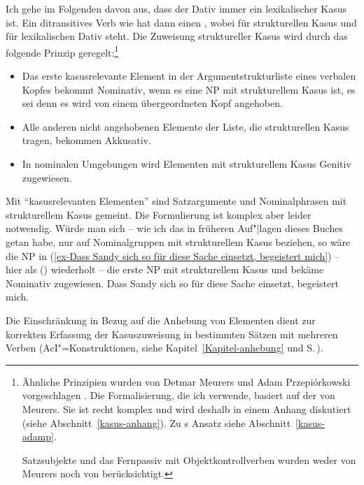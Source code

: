 Ich gehe im Folgenden davon aus, dass der Dativ immer ein lexikalischer Kasus ist. 
Ein ditransitives Verb wie  hat dann einen \compsw {},
wobei  für strukturellen Kasus und  für lexikalischen Dativ steht.
Die Zuweisung struktureller Kasus wird durch das folgende Prinzip geregelt:\footnote{
  Ähnliche Prinzipien wurden von Detmar Meurers und Adam Przepiórkowski
  vorgeschlagen \parencites[238]{Prze99}[80,93--94]{Prze99b}[206--207]{Meurers99b}[51--53]{MdK2001a}[Abschnitt~10.4.1.4]{Meurers2000b}.
  Die Formalisierung, die ich verwende, basiert auf der von Meurers. Sie ist recht komplex und wird
  deshalb in einem Anhang diskutiert (siehe Abschnitt~\ref{kasus-anhang}). Zu \prz{}s Ansatz siehe Abschnitt~\ref{kasus-adamp}.

  Satzsubjekte und das Fernpassiv mit Objektkontrollverben wurden weder von Meurers noch von \prz berücksichtigt.
%
}
\begin{prinzip-break}[Kasusprinzip]
\label{case-p}
\begin{itemize}
\item Das erste kasusrelevante Element in der Argumentstrukturliste eines verbalen Kopfes bekommt
  Nominativ, wenn es eine NP mit strukturellem Kasus ist, es sei denn es wird von einem übergeordneten Kopf angehoben. 
\item Alle anderen nicht angehobenen Elemente der Liste, die strukturellen Kasus tragen, bekommen Akkusativ.
\item In nominalen Umgebungen wird Elementen mit strukturellem Kasus Genitiv zugewiesen.
\end{itemize}
\end{prinzip-break}
Mit "`kasusrelevanten Elementen"'\label{page-kasusrelevante-XP} sind Satzargumente und Nominalphrasen mit strukturellem Kasus
gemeint. Die Formulierung ist komplex aber leider notwendig. Würde man sich -- wie ich das in
früheren Auf"|lagen dieses Buches getan habe, nur auf Nominalgruppen
mit strukturellem Kasus beziehen, so wäre die NP in (\ref{ex-Dass Sandy sich so für diese Sache
  einsetzt, begeistert mich}) -- hier als () wiederholt -- die erste NP mit strukturellem Kasus
und bekäme Nominativ zugewiesen. 
\ea
\label{ex-Dass Sandy sich so für diese Sache einsetzt, begeistert mich-zwei}%
Dass Sandy sich so für diese Sache einsetzt, begeistert mich.
\z

\noindent
Die Einschränkung in Bezug auf die Anhebung von Elementen dient zur korrekten Erfassung der
Kasuszuweisung in bestimmten Sätzen mit mehreren Verben (\zb AcI"=Konstruktionen, siehe
Kapitel~\ref{Kapitel-anhebung} und S.\,\pageref{page-aci-kasus}). 

